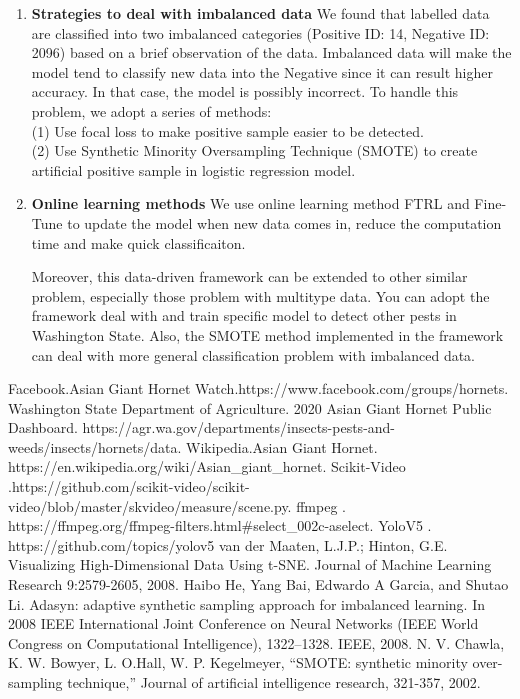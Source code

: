 \documentclass[12pt]{article}
\begin{document}
	\begin{enumerate}[\bf 1.]
		\item \textbf{Strategies to deal with imbalanced data}
		We found that labelled data are classified into two imbalanced categories (Positive ID: 14, Negative ID: 2096) based on a brief observation of the data. Imbalanced data will make the model tend to classify new data into the Negative since it can result higher accuracy. In that case, the model is possibly incorrect. To handle this problem, we adopt a series of methods:\\
		(1) Use focal loss to make positive sample easier to be detected.\\
		(2) Use Synthetic Minority Oversampling Technique (SMOTE) to create artificial positive sample in logistic regression model.
		\item \textbf{Online learning methods}
		We use online learning method FTRL and Fine-Tune to update the model when new data comes in, reduce the computation time and make quick classificaiton.
		
		
		Moreover, this data-driven framework can be extended to other similar problem, especially those problem with multitype data. You can adopt the framework deal with and train specific model to detect other pests in Washington State. Also, the SMOTE method implemented in the framework can deal with more general classification problem with imbalanced data.
	\end{enumerate}
		
\clearpage
\begin{thebibliography}{99}
	Facebook.Asian Giant Hornet Watch.https://www.facebook.com/groups/hornets.
	Washington State Department of Agriculture. 2020 Asian Giant Hornet Public 
	Dashboard. https://agr.wa.gov/departments/insects-pests-and-weeds/insects/hornets/data.
	Wikipedia.Asian Giant Hornet. https://en.wikipedia.org/wiki/Asian\_giant\_hornet.
	Scikit-Video .https://github.com/scikit-video/scikit-video/blob/master/skvideo/measure/scene.py.
	ffmpeg . https://ffmpeg.org/ffmpeg-filters.html\#select\_002c-aselect.
	YoloV5 . https://github.com/topics/yolov5
	van der Maaten, L.J.P.; Hinton, G.E. Visualizing High-Dimensional Data Using t-SNE. Journal of Machine Learning Research 9:2579-2605, 2008.
	Haibo He, Yang Bai, Edwardo A Garcia, and Shutao Li. Adasyn: adaptive synthetic sampling approach for imbalanced learning. In 2008 IEEE International Joint Conference on Neural Networks (IEEE World Congress on Computational Intelligence), 1322–1328. IEEE, 2008.
	N. V. Chawla, K. W. Bowyer, L. O.Hall, W. P. Kegelmeyer, “SMOTE: synthetic minority over-sampling technique,” Journal of artificial intelligence research, 321-357, 2002.
\end{thebibliography}
\end{document}
